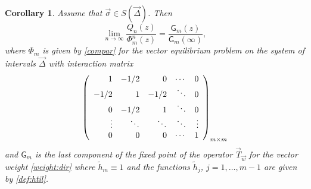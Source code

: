 \documentclass{amsart}
\numberwithin{equation}{section}
\newtheorem{corollary}[theorem]{Corollary}
\theoremstyle{definition}
\begin{document}
\begin{corollary}
	\label{cauchy}
	Assume that $\vec{\sigma} \in S(\vec{\Delta})$. Then
 \[
   \lim_{n \to \infty} \frac{Q_{n}(z)}{\Phi_m^{n}(z)} = \frac{\mathsf{G}_m(z)}{\mathsf{G}_m(\infty)},
\]
where $\Phi_m$ is given by \eqref{compar} for the vector equilibrium problem on the system of intervals $\vec{\Delta}$ with interaction matrix
 \[
 \left(\begin{array}{r r r r r}
 1      & -1/2 &  0 & \cdots &  0 \\
-1/2      &  1 & -1/2 & \ddots &   0 \\
 0      & -1/2 &  1 & \ddots &   0 \\
 \vdots &  \ddots  &  \ddots  & \ddots &    \vdots \\
 0      &  0 &  0 & \cdots &  1
\end{array}
\right)_{m\times m}
\]
and $\mathsf{G}_m$ is the last component of the fixed point of the operator
$\vec{T}_{\vec{w}}$ for the vector weight \eqref{weight:dir}
 where $\tilde{h}_m\equiv 1$ and the functions $\tilde{h}_j$, $j=1,\ldots,m-1$ are given by \eqref{def:htil}.
\end{corollary}
\end{document}
